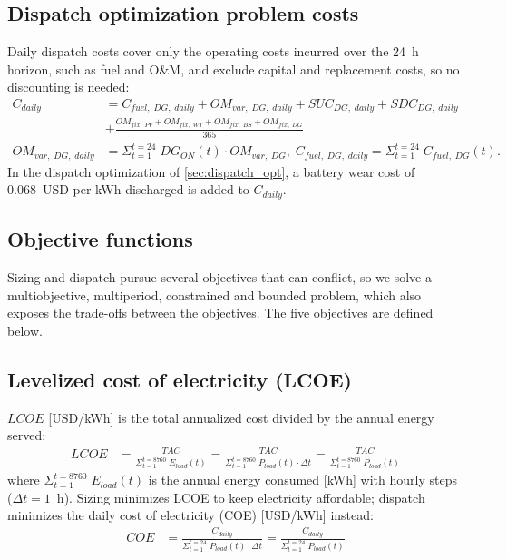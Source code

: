 \documentclass[final,3p,times]{elsarticle}
\begin{document}
\subsection{Dispatch optimization problem costs}

Daily dispatch costs cover only the operating costs incurred over the 24~h horizon, such as fuel and O\&M, and exclude capital and replacement costs, so no discounting is needed:
\begin{align*}
    C_{daily} & = C_{fuel,\; DG,\; daily} + OM_{var, \; DG,\; daily} + SUC_{DG,\;daily} + SDC_{DG,\;daily} \\
    & + \frac{OM_{fix,\;PV} + OM_{fix,\;WT} + OM_{fix,\;BS} + OM_{fix,\;DG}}{365} \\
    OM_{var, \; DG,\; daily} & = \Sigma_{t=1}^{t=24} \; DG_{ON}(t) \cdot OM_{var, \; DG}, \; C_{fuel,\; DG,\; daily} = \Sigma_{t=1}^{t=24} \; C_{fuel,\; DG}(t). 
\end{align*}
In the dispatch optimization of \cref{sec:dispatch_opt}, a battery wear cost of 0.068~USD per kWh discharged is added to $C_{daily}$.

\subsection{Objective functions}

Sizing and dispatch pursue several objectives that can conflict, so we solve a multiobjective, multiperiod, constrained and bounded problem, which also exposes the trade-offs between the objectives. The five objectives are defined below.

\subsection{Levelized cost of electricity (LCOE)}
$LCOE$ [USD/kWh] is the total annualized cost divided by the annual energy served:
\begin{align}
    LCOE & = \frac{TAC}{\Sigma_{t=1}^{t=8760} \; E_{load}(t)} = \frac{TAC}{\Sigma_{t=1}^{t=8760} \; P_{load}(t)\cdot \Delta t} = \frac{TAC}{\Sigma_{t=1}^{t=8760} \; P_{load}(t)}
\end{align}
where $\Sigma_{t=1}^{t=8760} \; E_{load}(t)$ is the annual energy consumed [kWh] with hourly steps ($\Delta t = 1$~h). Sizing minimizes LCOE to keep electricity affordable; dispatch minimizes the daily cost of electricity (COE) [USD/kWh] instead:
\begin{align*}
    COE & = \frac{C_{daily}}{\Sigma_{t=1}^{t=24} \; P_{load} (t)\cdot \Delta t}  = \frac{C_{daily}}{\Sigma_{t=1}^{t=24} \; P_{load}(t)}
\end{align*}
\end{document}
